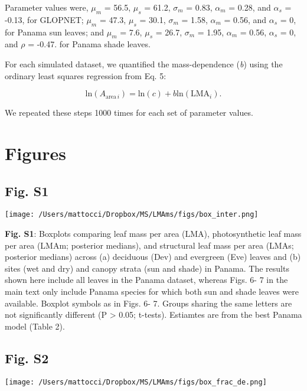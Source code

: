 \documentclass[
  12pt,
  letterpaper,
  DIV=11,
  numbers=noendperiod]{scrartcl}
\begin{document}
Parameter values were, \(\mu_m\) = 56.5, \(\mu_s\) = 61.2, \(\sigma_m\)
= 0.83, \(\alpha_m\) = 0.28, and \(\alpha_s\) = -0.13, for GLOPNET;
\(\mu_m\) = 47.3, \(\mu_s\) = 30.1, \(\sigma_m\) = 1.58, \(\alpha_m\) =
0.56, and \(\alpha_s\) = 0, for Panama sun leaves; and \(\mu_m\) = 7.6,
\(\mu_s\) = 26.7, \(\sigma_m\) = 1.95, \(\alpha_m\) = 0.56, \(\alpha_s\)
= 0, and \(\rho\) = -0.47. for Panama shade leaves.

For each simulated dataset, we quantified the mass-dependence (\emph{b})
using the ordinary least squares regression from Eq. 5:

\[
\mathrm{ln}(A_{\mathrm{area} \, i}) = \mathrm{ln}(c) + b \mathrm{ln}(\mathrm{LMA}_{i}).
\]

We repeated these steps 1000 times for each set of parameter values.

\newpage

\hypertarget{figures}{%
\section{Figures}\label{figures}}

\hypertarget{fig.-s1}{%
\subsection{Fig. S1}\label{fig.-s1}}

\texttt{[image: /Users/mattocci/Dropbox/MS/LMAms/figs/box\_inter.png]}

\textbf{Fig. S1}: Boxplots comparing leaf mass per area (LMA),
photosynthetic leaf mass per area (LMAm; posterior medians), and
structural leaf mass per area (LMAs; posterior medians) across (a)
deciduous (Dev) and evergreen (Eve) leaves and (b) sites (wet and dry)
and canopy strata (sun and shade) in Panama. The results shown here
include all leaves in the Panama dataset, whereas Figs. 6- 7 in the main
text only include Panama species for which both sun and shade leaves
were available. Boxplot symbols as in Figs. 6- 7. Groups sharing the
same letters are not significantly different (P \textgreater{} 0.05;
t-tests). Estiamtes are from the best Panama model (Table 2).

\newpage

\hypertarget{fig.-s2}{%
\subsection{Fig. S2}\label{fig.-s2}}

\texttt{[image: /Users/mattocci/Dropbox/MS/LMAms/figs/box\_frac\_de.png]}
\end{document}
